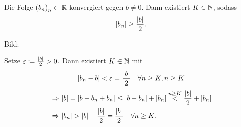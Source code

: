 \documentclass[../ana1.tex]{subfiles}
\begin{document}
\begin{lem}
	Die Folge \({(b_n)}_n \subset \mathbb{R} \) konvergiert gegen \(b\neq 0 \). Dann existiert \(K\in\mathbb{N} \), sodass
	\[\left|b_n\right| \geq \frac{\left|b\right|}{2}. \]
\end{lem}
\begin{bew}
	Bild:\\
	\begin{center}
	\end{center}
	Setze \(\varepsilon \coloneqq \frac{\left|b\right|}{2}>0 \). Dann existiert \(K\in\mathbb{N} \) mit
	\[\left|b_n-b\right| < \varepsilon = \frac{\left|b\right|}{2} \quad\forall n\geq K, n\geq K \]
	\begin{align*}
		&\Rightarrow \left|b\right| = \left|b-b_n + b_n\right| \leq \left|b-b_n\right| + \left|b_n\right| \overset{n\geq K}{<} \frac{\left|b\right|}{2} + \left|b_n\right|\\
		&\Rightarrow \left|b_n\right| > \left|b\right| - \frac{\left|b\right|}{2} = \frac{\left|b\right|}{2} \quad \forall n\geq K.
	\end{align*}
\end{bew}
\end{document}
